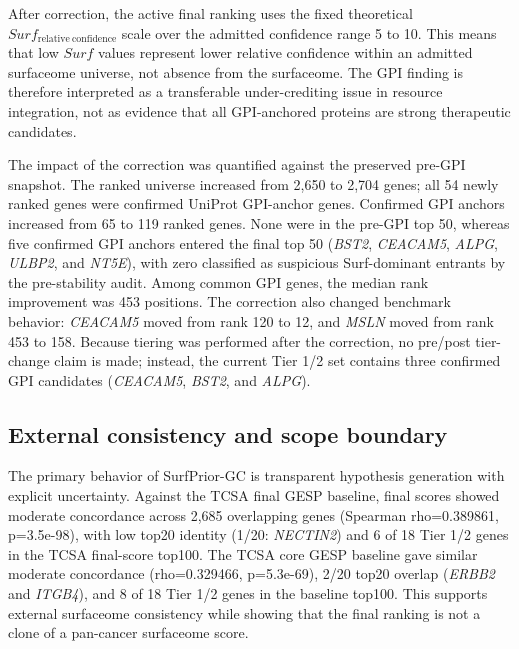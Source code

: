\documentclass[preprint,12pt,authoryear]{elsarticle}
\begin{document}
After correction, the active final ranking uses the fixed theoretical $Surf_{\mathrm{relative\ confidence}}$ scale over the admitted confidence range 5 to 10. This means that low $Surf$ values represent lower relative confidence within an admitted surfaceome universe, not absence from the surfaceome. The GPI finding is therefore interpreted as a transferable under-crediting issue in resource integration, not as evidence that all GPI-anchored proteins are strong therapeutic candidates.

The impact of the correction was quantified against the preserved pre-GPI snapshot. The ranked universe increased from 2,650 to 2,704 genes;\allowbreak{} all 54 newly ranked genes were confirmed UniProt GPI-anchor genes. Confirmed GPI anchors increased from 65 to 119 ranked genes. None were in the pre-GPI top 50, whereas five confirmed GPI anchors entered the final top 50 (\textit{BST2}, \textit{CEACAM5}, \textit{ALPG}, \textit{ULBP2}, and \textit{NT5E}), with zero classified as suspicious Surf-dominant entrants by the pre-stability audit. Among common GPI genes, the median rank improvement was 453 positions. The correction also changed benchmark behavior: \textit{CEACAM5} moved from rank 120 to 12, and \textit{MSLN} moved from rank 453 to 158. Because tiering was performed after the correction, no pre/\allowbreak{}post tier-change claim is made;\allowbreak{} instead, the current Tier 1/\allowbreak{}2 set contains three confirmed GPI candidates (\textit{CEACAM5}, \textit{BST2}, and \textit{ALPG}).

\subsection{External consistency and scope boundary}

The primary behavior of SurfPrior-GC is transparent hypothesis generation with explicit uncertainty. Against the TCSA final GESP baseline, final scores showed moderate concordance across 2,685 overlapping genes (Spearman rho=0.389861, p=3.5e-98), with low top20 identity (1/\allowbreak{}20: \textit{NECTIN2}) and 6 of 18 Tier 1/\allowbreak{}2 genes in the TCSA final-score top100. The TCSA core GESP baseline gave similar moderate concordance (rho=0.329466, p=5.3e-69), 2/\allowbreak{}20 top20 overlap (\textit{ERBB2} and \textit{ITGB4}), and 8 of 18 Tier 1/\allowbreak{}2 genes in the baseline top100. This supports external surfaceome consistency while showing that the final ranking is not a clone of a pan-cancer surfaceome score.
\end{document}
